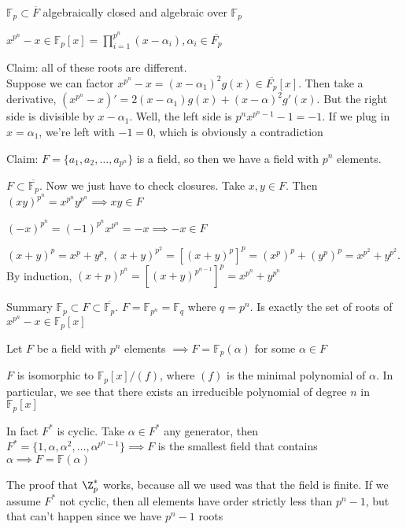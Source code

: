 \documentclass[twoside, 10pt]{article}
\newcommand{\F}{\mathbb{F}}
\begin{document}
\begin{cor}
    $\F_p \subset \overline{F}$ algebraically closed and algebraic over $\F_p$
\end{cor}

$x^{p^n} - x \in \F_p[x] = \prod\limits_{i = 1}^{p^n}(x - \alpha_i), \alpha_i \in \overline{F_p}$

Claim: all of these roots are different.\\
Suppose we can factor $x^{p^n} - x = (x - \alpha_1)^2g(x) \in \overline{F_p}[x]$. Then take a derivative, $(x^{p^n} - x)' = 2(x - \alpha_1)g(x) + (x -\alpha)^2g'(x)$. But the right side is divisible by $x-\alpha_1$. Well, the left side is $p^nx^{p^n - 1} - 1 = -1$. If we plug in $x = \alpha_1$, we're left with $-1 = 0$, which is obviously a contradiction

Claim: $F = \{a_1, a_2, \ldots, a_{p^n}\}$ is a field, so then we have a field with $p^n$ elements.

$F \subset \overline{\F_p}$. Now we just have to check closures. Take $x, y \in F$. Then $(xy)^{p^n} = x^{p^n}y^{p^n} \implies xy \in F$

$(-x)^{p^n} = (-1)^{p^n}x^{p^n} = -x \implies -x \in F$

$(x + y)^p = x^p + y^p$, $(x + y)^{p^2} = [(x + y)^p]^p = (x^p)^p + (y^p)^p = x^{p^2} + y^{p^2}$. By induction, $(x + p)^{p^n} = [(x + y)^{p^{n-1}}]^p = x^{p^n} + y^{p^n}$

Summary $\F_p \subset F \subset \overline{\F_p}$. $F = \F_{p^n} = \F_q$ where $q = p^n$. Is exactly the set of roots of $x^{p^n} - x \in \F_p[x]$

\begin{thm}
    Let $F$ be a field with $p^n$ elements $\implies F = \F_p(\alpha)$ for some $\alpha \in F$
\end{thm}

\begin{cor}
    $F$ is isomorphic to $\F_p[x]/(f)$, where $(f)$ is the minimal polynomial of $\alpha$. In particular, we see that there exists an irreducible polynomial of degree $n$ in $\F_p[x]$
\end{cor}

In fact $F^*$ is cyclic. Take $\alpha \in F^*$ any generator, then $F^* = \{1, \alpha, \alpha^2, \ldots, \alpha^{p^n - 1}\} \implies F$ is the smallest field that contains $\alpha \implies F = \F(\alpha)$

The proof that $\Z_p^*$ works, because all we used was that the field is finite. If we assume $F^*$ not cyclic, then all elements have order strictly less than $p^n - 1$, but that can't happen since we have $p^n - 1$ roots
\end{document}

